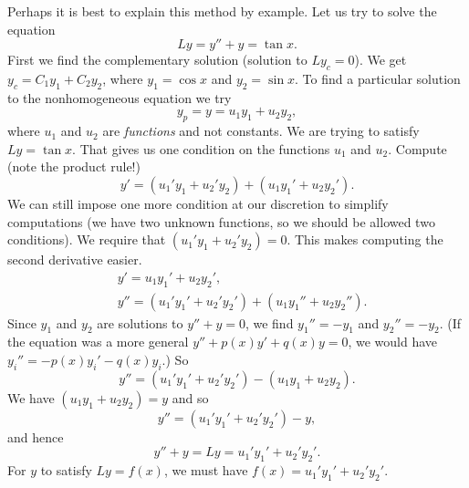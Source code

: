 Perhaps it is best to explain this method by example.
Let us try to solve the equation
\begin{equation*}
Ly = y''+y = \tan x .
\end{equation*}
First we find the complementary solution (solution to $Ly_c = 0$).  
We get $y_c = C_1 y_1 + C_2 y_2$, where $y_1 = \cos x$ and $y_2 = \sin x$.
To find a particular solution to the nonhomogeneous equation we try
\begin{equation*}
y_p = y = u_1 y_1 + u_2 y_2 ,
\end{equation*}
where $u_1$ and $u_2$ are \emph{functions} and not constants.
We are trying to satisfy $Ly = \tan x$.  That gives us one condition on the
functions $u_1$ and $u_2$.
Compute (note the product rule!)
\begin{equation*}
y' = (u_1' y_1 + u_2' y_2) + (u_1 y_1' + u_2 y_2').
\end{equation*}
We can still
impose one more condition at our discretion to simplify computations (we have two unknown functions,
so we should be allowed two conditions).  We require that
$(u_1' y_1 + u_2' y_2) = 0$.  This makes computing the second derivative
easier.
\begin{align*}
& y' = u_1 y_1' + u_2 y_2' , \\
& y'' = (u_1' y_1' + u_2' y_2') + (u_1 y_1'' + u_2 y_2'') .
\end{align*}
Since $y_1$ and $y_2$ are solutions to $y''+y = 0$, we find
$y_1'' = - y_1$
and $y_2'' = - y_2$.
(If the equation was a more general $y''+p(x)y' +q(x)y = 0$, we would have
$y_i'' = -p(x)y_i' -q(x)y_i$.) So 
\begin{equation*}
y'' = (u_1' y_1' + u_2' y_2') - (u_1 y_1 + u_2 y_2) .
\end{equation*}
We have $(u_1 y_1 + u_2 y_2) = y$ and so
\begin{equation*}
y'' = (u_1' y_1' + u_2' y_2') - y ,
\end{equation*}
and hence
\begin{equation*}
y'' + y = Ly = u_1' y_1' + u_2' y_2' .
\end{equation*}
For $y$ to satisfy $Ly = f(x)$, we must have
$f(x) = u_1' y_1' + u_2' y_2'$.

